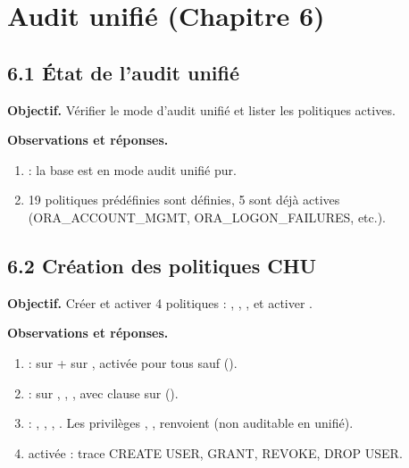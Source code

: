 \section{Audit unifié (Chapitre 6)}

\subsection{6.1 État de l'audit unifié}
\textbf{Objectif.} Vérifier le mode d'audit unifié et lister les politiques actives.


\textbf{Observations et réponses.}
\begin{enumerate}
  \item {} : la base est en mode audit unifié pur.
  \item 19 politiques prédéfinies sont définies, 5 sont déjà actives (ORA\_ACCOUNT\_MGMT, ORA\_LOGON\_FAILURES, etc.).
\end{enumerate}

\subsection{6.2 Création des politiques CHU}
\textbf{Objectif.} Créer et activer 4 politiques : , , , et activer .

 

\textbf{Observations et réponses.}
\begin{enumerate}
  \item {} :  sur  +  sur , activée pour tous sauf  ().
  \item {} :  sur , , , avec clause  sur  ().
  \item {} : , , , . Les privilèges , ,  renvoient  (non auditable en unifié).
  \item {} activée : trace CREATE USER, GRANT, REVOKE, DROP USER.
\end{enumerate}

